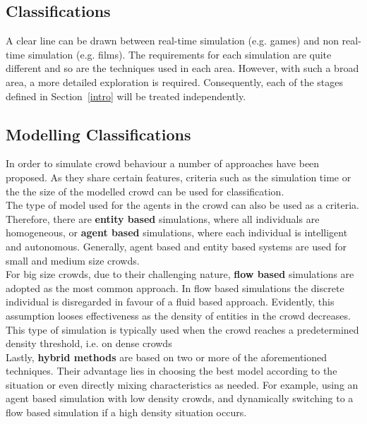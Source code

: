 \documentclass[6pt]{article} %
\begin{document}
\begin{multicols}{2}
\section{Classifications}

A clear line can be drawn between real-time simulation (e.g. games) and non real-time simulation (e.g. films).
The requirements for each simulation are quite different and so are the techniques used in each area.
However, with such a broad area, a more detailed exploration is required.
Consequently, each of the stages defined in Section~\ref{intro} will be treated independently.

\subsection{Modelling Classifications}
\label{subsec:ModelClassification}

In order to simulate crowd behaviour a number of approaches have been proposed.
As they share certain features, criteria such as the simulation time or the the size of the modelled crowd can be used for classification.\\

The type of model used for the agents in the crowd can also be used as a criteria.
Therefore, there are \textbf{entity based} simulations, where all individuals are homogeneous, or \textbf{agent based} simulations, where each individual is intelligent and autonomous.
Generally, agent based and entity based systems are used for small and medium size crowds.\\

For big size crowds, due to their challenging nature, \textbf{flow based} simulations are adopted as the most common approach.
In flow based simulations the discrete individual is disregarded in favour of a fluid based approach.
Evidently, this assumption looses effectiveness as the density of entities in the crowd decreases.
This type of simulation is typically used when the crowd reaches a predetermined density threshold, i.e. on dense crowds\\

Lastly, \textbf{hybrid methods} are based on two or more of the aforementioned techniques.
Their advantage lies in choosing the best model according to the situation or even directly mixing characteristics as needed.
For example, using an agent based simulation with low density crowds, and dynamically switching to a flow based simulation if a high density situation occurs.


\end{multicols}
\end{document}
